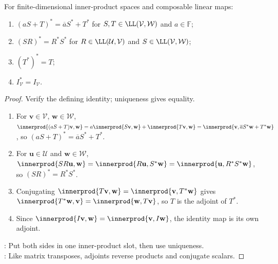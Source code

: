 \begin{proposition} \label{prop:basic-adjoint-identities} \\
For finite-dimensional inner-product spaces and composable linear maps:
\begin{enumerate}[label=\roman*.]
\setlength{\itemsep}{0pt}
\item $(aS+T)^*=\overline{a}S^*+T^*$ for $S,T\in\LL(\mathcal{V},\mathcal{W})$ and $a\in\mathbb{F}$;
\item $(SR)^*=R^*S^*$ for $R\in\LL(\mathcal{U},\mathcal{V})$ and $S\in\LL(\mathcal{V},\mathcal{W})$;
\item $(T^*)^*=T$;
\item $I_{\mathcal{V}}^*=I_{\mathcal{V}}$.
\end{enumerate}
\begin{proof}
Verify the defining identity; uniqueness gives equality.
\begin{enumerate}[label=(\roman*)]
\setlength{\itemsep}{0pt}
\item For $\mathbf{v}\in\mathcal{V}$, $\mathbf{w}\in\mathcal{W}$, $\innerprod{(aS+T)\mathbf{v},\mathbf{w}} =a\innerprod{S\mathbf{v},\mathbf{w}}+\innerprod{T\mathbf{v},\mathbf{w}} =\innerprod{\mathbf{v},\overline{a}S^*\mathbf{w}+T^*\mathbf{w}}$, so $(aS+T)^*=\overline{a}S^*+T^*$.
\item For $\mathbf{u}\in\mathcal{U}$ and $\mathbf{w}\in\mathcal{W}$, $\innerprod{SR\mathbf{u},\mathbf{w}} =\innerprod{R\mathbf{u},S^*\mathbf{w}} =\innerprod{\mathbf{u},R^*S^*\mathbf{w}}$, so $(SR)^*=R^*S^*$.
\item Conjugating $\innerprod{T\mathbf{v},\mathbf{w}}=\innerprod{\mathbf{v},T^*\mathbf{w}}$ gives $\innerprod{T^*\mathbf{w},\mathbf{v}}=\innerprod{\mathbf{w},T\mathbf{v}}$, so $T$ is the adjoint of $T^*$.
\item Since $\innerprod{I\mathbf{v},\mathbf{w}}=\innerprod{\mathbf{v},I\mathbf{w}}$, the identity map is its own adjoint.
\end{enumerate}
: Put both sides in one inner-product slot, then use uniqueness.\\
: Like matrix transposes, adjoints reverse products and conjugate scalars.
\end{proof}
\end{proposition}

